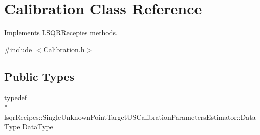 \hypertarget{class_calibration}{\section{Calibration Class Reference}
\label{d2/d40/class_calibration}
}


Implements L\-S\-Q\-R\-Recepies methods.  




{\ttfamily \#include $<$Calibration.\-h$>$}

\subsection*{Public Types}
\begin{DoxyCompactItemize}
\item 
typedef \\*
lsqr\-Recipes\-::\-Single\-Unknown\-Point\-Target\-U\-S\-Calibration\-Parameters\-Estimator\-::\-Data\-Type \hyperlink{class_calibration_af52a8932eb28acdb8d9c35fb863145d6}{Data\-Type}
\end{DoxyCompactItemize}

